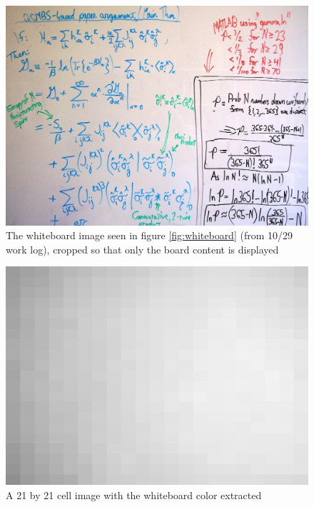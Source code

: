 \documentclass[]{article}
\begin{document}
\begin{figure}[H]
\centering
\includegraphics[scale=1]{images/whiteboard_cropped}
\caption{The whiteboard image seen in figure \ref{fig:whiteboard} (from 10/29 work log), cropped so that only the board content is displayed}
\label{fig:whiteboard_cropped}
\end{figure}

\begin{figure}[H]
\centering
\includegraphics[scale=0.25]{images/wb_crop_background_1}
\caption{A 21 by 21 cell image with the whiteboard color extracted}
\end{figure}
\end{document}
